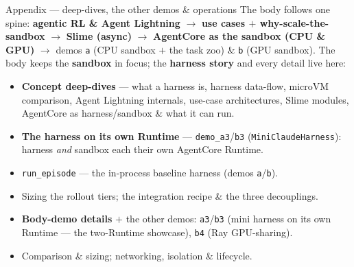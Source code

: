 \documentclass[aspectratio=169]{beamer}
\begin{document}
\begin{frame}{Appendix --- deep-dives, the other demos \& operations}
  \footnotesize The body follows one spine: \textbf{agentic RL \& Agent Lightning} $\to$
  \textbf{use cases $+$ why-scale-the-sandbox} $\to$ \textbf{Slime (async)} $\to$
  \textbf{AgentCore as the sandbox (CPU \& GPU)} $\to$ demos \texttt{a} (CPU sandbox $+$ the task
  zoo) \& \texttt{b} (GPU sandbox). The body keeps the \textbf{sandbox} in focus; the
  \textbf{harness story} and every detail live here:
  \begin{itemize}\setlength\itemsep{0.12em}
    \item \textbf{Concept deep-dives} --- what a harness is, harness data-flow,
      microVM comparison, Agent Lightning internals, use-case architectures, Slime modules, AgentCore
      as harness/sandbox \& what it can run.
    \item \textbf{The harness on its own Runtime} --- \texttt{demo\_a3}/\texttt{b3}
      (\texttt{MiniClaudeHarness}): harness \emph{and} sandbox each their own AgentCore Runtime.
    \item \texttt{run\_episode} --- the in-process baseline harness (demos \texttt{a}/\texttt{b}).
    \item Sizing the rollout tiers; the integration recipe \& the three decouplings.
    \item \textbf{Body-demo details} $+$ the other demos: \texttt{a3}/\texttt{b3} (mini harness on its
      own Runtime --- the two-Runtime showcase), \texttt{b4} (Ray GPU-sharing).
    \item Comparison \& sizing; networking, isolation \& lifecycle.
  \end{itemize}
\end{frame}
\end{document}

